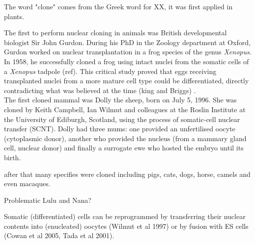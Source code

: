 The word "clone" comes from the Greek word for XX, it was first applied in plants.

The first to perform nuclear cloning in animals was British developmental biologist Sir John Gurdon. 
During his PhD in the Zoology department at Oxford, Gurdon worked on nuclear transplantation in a frog species of the genus \textit{Xenopus}.
In 1958, he successfully cloned a frog using intact nuclei from the somatic cells of a \textit{Xenopus} tadpole (ref).
This critical study proved that eggs receiving transplanted nuclei from a more mature cell type could be differentiated, directly contradicting what was believed at the time (king and Briggs) \cite{king1955changes}. \\

The first cloned mammal was Dolly the sheep, born on July 5, 1996.
She was cloned by Keith Campbell, Ian Wilmut and colleagues at the Roslin Institute at the University of Ediburgh, Scotland, using the process of somatic-cell nuclear transfer (SCNT).
Dolly had three mums: one provided an unfertilised oocyte (cytoplasmic donor), another who provided the nucleus (from a mammary gland cell, nuclear donor) and finally a surrogate ewe who hosted the embryo until its birth.

after that many specifies were cloned including pigs, cats, dogs, horse, camels and even macaques.

Problematic Lulu and Nana?



Somatic (differentiated) cells can be reprogrammed by transferring their nuclear contents into (enucleated) oocytes (Wilmut et al 1997) or by fusion with ES cells (Cowan et al 2005, Tada et al 2001).

